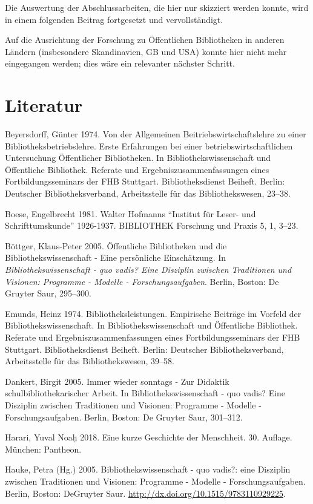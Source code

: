 \documentclass[a4paper,
fontsize=11pt,
oneside,
numbers=noperiodatend,
parskip=half-,
bibliography=totoc,
final
]{scrartcl}
\begin{document}
Die Auswertung der Abschlussarbeiten, die hier nur skizziert werden
konnte, wird in einem folgenden Beitrag fortgesetzt und vervollständigt.

Auf die Ausrichtung der Forschung zu Öffentlichen Bibliotheken in
anderen Ländern (insbesondere Skandinavien, GB und USA) konnte hier
nicht mehr eingegangen werden; dies wäre ein relevanter nächster
Schritt.

\hypertarget{literatur}{%
\section{Literatur}\label{literatur}}

Beyersdorff, Günter 1974. Von der Allgemeinen Beitriebswirtschaftslehre
zu einer Bibliotheksbetriebslehre. Erste Erfahrungen bei einer
betriebswirtschaftlichen Untersuchung Öffentlicher Bibliotheken. In
Bibliothekswissenschaft und Öffentliche Bibliothek. Referate und
Ergebniszusammenfassungen eines Fortbildungsseminars der FHB Stuttgart.
Bibliotheksdienst Beiheft. Berlin: Deutscher Bibliotheksverband,
Arbeitsstelle für das Bibliothekswesen, 23--38.

Boese, Engelbrecht 1981. Walter Hofmanns \enquote{Institut für Leser-
und Schrifttumskunde} 1926-1937. BIBLIOTHEK Forschung und Praxis 5, 1,
3--23.

Böttger, Klaus-Peter 2005. Öffentliche Bibliotheken und die
Bibliothekswissenschaft - Eine persönliche Einschätzung. In
\emph{Bibliothekswissenschaft - quo vadis? Eine Disziplin zwischen
Traditionen und Visionen: Programme - Modelle - Forschungsaufgaben}.
Berlin, Boston: De Gruyter Saur, 295--300.

Emunds, Heinz 1974. Bibliotheksleistungen. Empirische Beiträge im
Vorfeld der Bibliothekswissenschaft. In Bibliothekswissenschaft und
Öffentliche Bibliothek. Referate und Ergebniszusammenfassungen eines
Fortbildungsseminars der FHB Stuttgart. Bibliotheksdienst Beiheft.
Berlin: Deutscher Bibliotheksverband, Arbeitsstelle für das
Bibliothekswesen, 39--58.

Dankert, Birgit 2005. Immer wieder sonntags - Zur Didaktik
schulbibliothekarischer Arbeit. In Bibliothekswissenschaft - quo vadis?
Eine Disziplin zwischen Traditionen und Visionen: Programme - Modelle -
Forschungsaufgaben. Berlin, Boston: De Gruyter Saur, 301--312.

Harari, Yuval Noaḥ 2018. Eine kurze Geschichte der Menschheit. 30.
Auflage. München: Pantheon.

Hauke, Petra (Hg.) 2005. Bibliothekswissenschaft - quo vadis?: eine
Disziplin zwischen Traditionen und Visionen: Programme - Modelle -
Forschungsaufgaben. Berlin, Boston: DeGruyter Saur.
\url{http://dx.doi.org/10.1515/9783110929225}.
\end{document}
